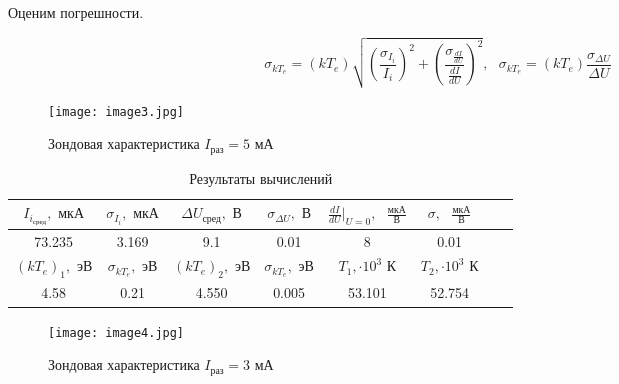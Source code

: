 \documentclass[a4paper,12pt]{article} %
\begin{document}
\begin{enumerate}
    Оценим погрешности.
    
    \[ \sigma_{kT_{e}} = (kT_{e})\sqrt{\left(\frac{\sigma_{I_{i}}}{I_{i}}\right)^2 + \left(\frac{\sigma_{\frac{dI}{dU}}}{\frac{dI}{dU}}\right)^2}, \text{ } \sigma_{kT_{e}} = (kT_{e})\frac{\sigma_{\Delta U}}{\Delta U} \]

    \begin{figure}[h]
        \begin{center}
    		\texttt{[image: image3.jpg]}
        \end{center}
        \caption{Зондовая характеристика $I_{\text{раз}}=5 \text{ мА}$}
        \label{plot3}
    \end{figure}

    \begin{table}[h]
	\centering
	\begin{tabular}{|c|c|c|c|c|c|c|c|}
            \hline
            $I_{i_\text{сред}}, \text{ мкА}$ & $\sigma_{I_{i}}, \text{ мкА}$ & $\Delta U_{\text{сред}}, \text{ В}$ & $\sigma_{\Delta U}, \text{ В}$ & $\frac{dI}{dU}|_{U=0}, \text{ }\frac{\text{мкА}}{\text{В}}$ & $\sigma, \text{ }\frac{\text{мкА}}{\text{В}}$ \\ \hline
            73.235 & 3.169 & 9.1 & 0.01 & 8 & 0.01 \\ \hline
            $(kT_{e})_1, \text{ эВ}$ & $\sigma_{kT_{e}}, \text{ эВ}$ & $(kT_{e})_2, \text{ эВ}$ & $\sigma_{kT_{e}}, \text{ эВ}$ & $T_1, \cdot 10^3 \text{ К}$ & $T_2, \cdot 10^3 \text{ К}$ \\ \hline
            4.58 & 0.21 & 4.550 & 0.005 & 53.101 & 52.754  \\ \hline
	\end{tabular}
	\caption{Результаты вычислений}
	\label{tab3}
    \end{table}

    \newpage

    \begin{figure}[h]
        \begin{center}
    		\texttt{[image: image4.jpg]}
        \end{center}
        \caption{Зондовая характеристика $I_{\text{раз}}=3 \text{ мА}$}
        \label{plot4}
    \end{figure}


\end{enumerate}
\end{document}

